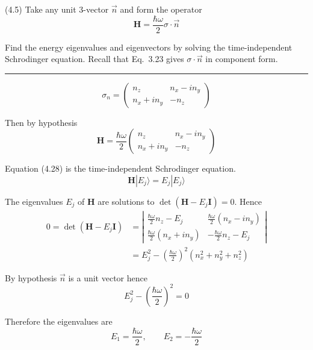\documentclass[12pt]{article}
\begin{document}
(4.5)
Take any unit 3-vector $\vec n$ and form the operator
\begin{equation*}
\mathbf H=\frac{\hbar\omega}{2}\sigma\cdot\vec n
\end{equation*}

Find the energy eigenvalues and eigenvectors by solving the
time-independent Schrodinger equation.
Recall that Eq.~3.23 gives $\sigma\cdot\vec n$ in component form.

\bigskip
\hrule

\bigskip
\begin{equation*}
\sigma_n=\begin{pmatrix}
n_z & n_x-in_y
\\
n_x+in_y & -n_z
\end{pmatrix}
\tag{3.23}
\end{equation*}

Then by hypothesis
\begin{equation*}
\mathbf H=\frac{\hbar\omega}{2}
\begin{pmatrix}
n_z & n_x-in_y
\\
n_x+in_y & -n_z
\end{pmatrix}
\end{equation*}

Equation (4.28) is the time-independent Schrodinger equation.
\begin{equation*}
\mathbf H|E_j\rangle=E_j|E_j\rangle
\tag{4.28}
\end{equation*}

The eigenvalues $E_j$ of $\mathbf H$ are solutions to $\det(\mathbf H-E_j\mathbf I)=0$.
Hence
\begin{align*}
0=\det(\mathbf H-E_j\mathbf I)
&=\left|
\begin{matrix}
\frac{\hbar\omega}{2}n_z-E_j & \frac{\hbar\omega}{2}(n_x-in_y)
\\[1ex]
\frac{\hbar\omega}{2}(n_x+in_y) & -\frac{\hbar\omega}{2}n_z-E_j
\end{matrix}
\right|
\\
&=E_j^2-\left(\frac{\hbar\omega}{2}\right)^2\left(n_x^2+n_y^2+n_z^2\right)
\end{align*}

By hypothesis $\vec n$ is a unit vector hence
\begin{equation*}
E_j^2-\left(\frac{\hbar\omega}{2}\right)^2=0
\end{equation*}

Therefore the eigenvalues are
\begin{equation*}
E_1=\frac{\hbar\omega}{2},\qquad E_2=-\frac{\hbar\omega}{2}
\end{equation*}
\end{document}
